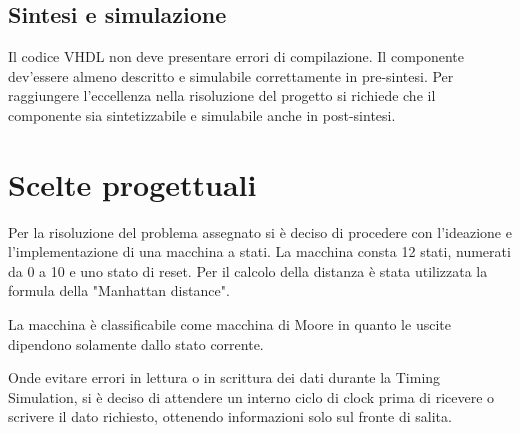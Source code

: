 \documentclass[a4paper,12pt]{article}
\begin{document}
\subsection{Sintesi e simulazione}
Il codice VHDL non deve presentare errori di compilazione. Il componente dev'essere almeno descritto e simulabile correttamente in pre-sintesi. Per raggiungere l'eccellenza nella risoluzione del progetto si richiede che il componente sia sintetizzabile e simulabile anche in post-sintesi.


\section{Scelte progettuali}
Per la risoluzione del problema assegnato si è deciso di procedere con l'ideazione e l'implementazione di una macchina a stati. La macchina consta 12 stati, numerati da 0 a 10 e uno stato di reset. 
Per il calcolo della distanza è stata utilizzata la formula della "Manhattan distance".

La macchina è classificabile come macchina di Moore in quanto le uscite dipendono solamente dallo stato corrente.

Onde evitare errori in lettura o in scrittura dei dati durante la Timing Simulation, si è deciso di attendere un interno ciclo di clock prima di ricevere o scrivere il dato richiesto, ottenendo informazioni solo sul fronte di salita.
\end{document}
